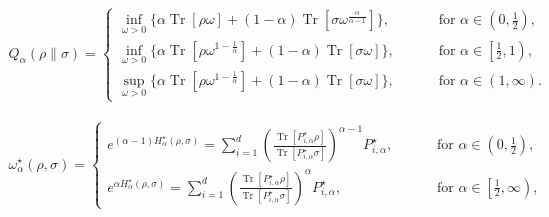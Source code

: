\documentclass[10pt,a4paper]{amsart}
\DeclareMathOperator{\Tr}{Tr}
\begin{document}
\begin{align}\label{eq:varformrenent2}
Q_{\alpha}(\rho\|\sigma)=\begin{cases}
\inf_{\omega>0}\big\{ \alpha\Tr[\rho\omega]+\left(1-\alpha\right)\Tr[\sigma\omega^{\frac{\alpha}{\alpha-1}}]\big\}, & \qquad\text{ for }\alpha  \in\left(0,\frac{1}{2}\right),\\
\inf_{\omega>0}\big\{ \alpha\Tr[\rho\omega^{1-\frac{1}{\alpha}}]+\left(1-\alpha\right)\Tr[\sigma\omega]\big\}, & \qquad\text{ for }\alpha  \in\left[\frac{1}{2},1\right),\\
\sup_{\omega>0}\big\{ \alpha\Tr[\rho\omega^{1-\frac{1}{\alpha}}]+\left(1-\alpha\right)\Tr[\sigma\omega]\big\}, & \qquad\text{ for }\alpha  \in\left(1,\infty\right).
\end{cases}
\end{align}

\begin{align} \label{eq:optrelvarform}
\omega_{\alpha}^{\star}(\rho,\sigma)= \begin{cases}
e^{(\alpha-1) H_{\alpha}^{\star}(\rho,\sigma)}=\sum_{i=1}^d\left(\frac{\Tr[P_{i,\alpha}^{\star} \rho]}{\Tr[P_{i,\alpha}^{\star} \sigma]} \right)^{\alpha-1} P_{i,\alpha}^{\star}, &\qquad\text{ for }\alpha  \in \left(0,\frac{1}{2}\right),  \\
e^{\alpha H_{\alpha}^{\star}(\rho,\sigma)}=\sum_{i=1}^d\left(\frac{\Tr[P_{i,\alpha}^{\star} \rho]}{\Tr[P_{i,\alpha}^{\star} \sigma]} \right)^{\alpha} P_{i,\alpha}^{\star}, &\qquad\text{ for }\alpha  \in\left[\frac{1}{2},\infty\right ), 
\end{cases}
\end{align}
\end{document}
